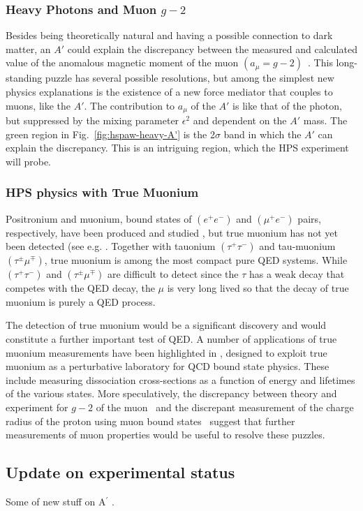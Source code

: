 \subsubsection{Heavy Photons and Muon $g-2$}

Besides being theoretically natural and having a possible connection to dark matter, an $A'$ could explain the discrepancy between the measured and 
calculated value of the anomalous magnetic moment of the muon $(a_\mu=g-2)$~\cite{Pospelov:2008zw}.  
This long-standing puzzle has several possible resolutions, but among the simplest new physics explanations
is the existence of a new force mediator that couples to muons, like the $A'$.  The contribution to $a_\mu$ of the $A'$ 
is like that of the photon, but suppressed by the mixing parameter $\epsilon^2$ and dependent on the $A'$ mass.  
The green region in Fig.~\ref{fig:hspaw-heavy-A'} is the 2$\sigma$ band in which the $A'$ can 
explain the discrepancy.  This is an intriguing region, which the HPS experiment will probe.  

\subsubsection{HPS physics with True Muonium}

Positronium and muonium, bound states of $(e^+ e^-)$ and $(\mu^+ e^-)$ pairs, respectively, have been
produced and studied \cite{Deutsch:1951zza,Friedman:1957mz,Hughes:1960zz}, but true muonium has not yet been 
detected (see e.g. \cite{Holvik:1986ty,ArteagaRomero:2000yh,Brodsky:2009gx,Bilenky:1969zd,Hughes:1971,Malenfant:1987tm,Karshenboim:1998we,Owen:1972,Jentschura:1997ma,Jentschura:1997tv,Karshenboim:1998am}. 
Together with tauonium $(\tau^+ \tau^-)$ and tau-muonium $(\tau^{\pm} \mu^{\mp})$, true muonium is among the most
compact pure QED systems. While $(\tau^+ \tau^-)$ and $(\tau^{\pm} \mu^{\mp})$ are difficult to detect since the $\tau$ has a
weak decay that competes with the QED decay, the $\mu$ is very long lived so that the decay of true
muonium is purely a QED process. 

The detection of true muonium would be a significant discovery and would constitute a further important test of QED.   
A number of applications of true muonium measurements have been highlighted in 
\cite{Brodsky:2009gx}, designed to exploit true muonium as a perturbative laboratory 
for QCD bound state physics. 
These include measuring dissociation cross-sections as a function of energy and lifetimes of the various states. 
More speculatively, the discrepancy between theory and experiment for $g-2$ of the muon~\cite{Bennett:2006fi} and the discrepant measurement of
the charge radius of the proton using muon bound states~\cite{Pohl:2010zza} suggest that further measurements of 
muon properties would be useful to resolve these puzzles. 


\subsection{Update on experimental status}

Some of new stuff on A$^\prime$ \cite{andreas,endo:g2e,rarek}.




